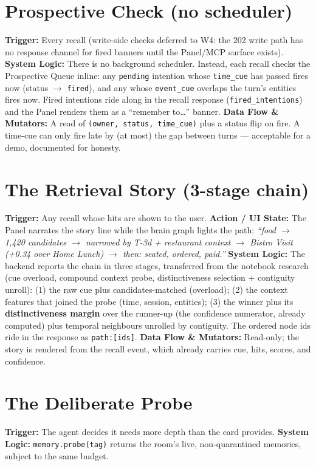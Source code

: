 \section{Prospective Check (no scheduler)}
\textbf{Trigger:} Every recall (write-side checks deferred to W4: the 202 write path has
no response channel for fired banners until the Panel/MCP surface exists).
\textbf{System Logic:} There is no background scheduler. Instead, each recall checks the
Prospective Queue inline: any \texttt{pending} intention whose \texttt{time\_cue} has passed
fires now (status $\rightarrow$ \texttt{fired}), and any whose \texttt{event\_cue} overlaps the
turn's entities fires now. Fired intentions ride along in the recall response
(\texttt{fired\_intentions}) and the Panel renders them as a ``remember to\ldots'' banner.
\textbf{Data Flow \& Mutators:} A read of \texttt{(owner, status, time\_cue)} plus a status flip
on fire. A time-cue can only fire late by (at most) the gap between turns --- acceptable for a
demo, documented for honesty.

\section{The Retrieval Story (3-stage chain)}
\textbf{Trigger:} Any recall whose hits are shown to the user.
\textbf{Action / UI State:} The Panel narrates the story line while the brain graph lights the
path: \emph{``food $\rightarrow$ 1,420 candidates $\rightarrow$ narrowed by T-3d + restaurant
context $\rightarrow$ Bistro Visit (+0.34 over Home Lunch) $\rightarrow$ then: seated, ordered,
paid.''}
\textbf{System Logic:} The backend reports the chain in three stages, transferred from the
notebook research (cue overload, compound context probe, distinctiveness selection + contiguity
unroll): (1) the raw cue plus candidates-matched (overload); (2) the context features that joined
the probe (time, session, entities); (3) the winner plus its \textbf{distinctiveness margin} over
the runner-up (the confidence numerator, already computed) plus temporal neighbours unrolled by
contiguity. The ordered node ids ride in the response as \texttt{path:[ids]}.
\textbf{Data Flow \& Mutators:} Read-only; the story is rendered from the recall event, which
already carries cue, hits, scores, and confidence.

\section{The Deliberate Probe}
\textbf{Trigger:} The agent decides it needs more depth than the card provides.
\textbf{System Logic:} \texttt{memory.probe(tag)} returns the room's live, non-quarantined memories,
subject to the same budget.
